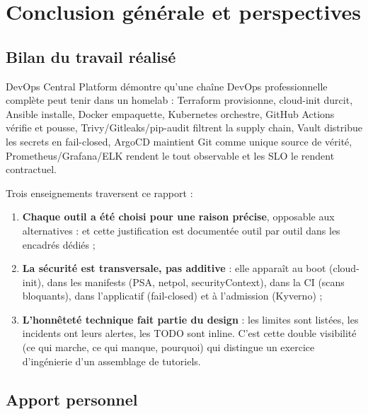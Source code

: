 \documentclass[12pt,a4paper,twoside,openright]{report}
\makeatletter
\def\cleardoublepage{\clearpage\if@twoside
  \ifodd\c@page\else\hbox{}\thispagestyle{empty}\newpage\fi\fi}
\makeatother
\begin{document}
\cleardoublepage
\chapter*{Conclusion générale et perspectives}

\section*{Bilan du travail réalisé}


DevOps Central Platform démontre qu'une chaîne DevOps professionnelle complète peut tenir dans un homelab : Terraform provisionne, cloud-init durcit, Ansible installe, Docker empaquette, Kubernetes orchestre, GitHub Actions vérifie et pousse, Trivy/Gitleaks/pip-audit filtrent la supply chain, Vault distribue les secrets en fail-closed, ArgoCD maintient Git comme unique source de vérité, Prometheus/Grafana/ELK rendent le tout observable et les SLO le rendent contractuel.

Trois enseignements traversent ce rapport :

\begin{enumerate}[itemsep=2pt]
  \item \textbf{Chaque outil a été choisi pour une raison précise}, opposable aux alternatives : et cette justification est documentée outil par outil dans les encadrés dédiés ;
  \item \textbf{La sécurité est transversale, pas additive} : elle apparaît au boot (cloud-init), dans les manifests (PSA, netpol, securityContext), dans la CI (scans bloquants), dans l'applicatif (fail-closed) et à l'admission (Kyverno) ;
  \item \textbf{L'honnêteté technique fait partie du design} : les limites sont listées, les incidents ont leurs alertes, les TODO sont inline. C'est cette double visibilité (ce qui marche, ce qui manque, pourquoi) qui distingue un exercice d'ingénierie d'un assemblage de tutoriels.
\end{enumerate}



\section*{Apport personnel}
\end{document}
